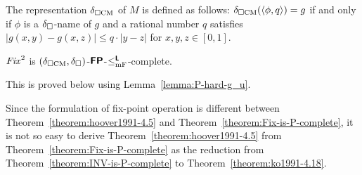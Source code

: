 \documentclass[envcountsame,orivec,oribibl]{llncs}
\begin{document}
The representation $\delta _{\square \mathrm{CM}}$ of $M$ is defined as follows:
$\delta _{\square \mathrm{CM}}(\langle \phi, q \rangle) = g$ if and only if
$\phi$ is a $\delta _\square$-name of $g$ and a rational number $q$ satisfies 
$|g(x, y) - g(x, z)| \le q \cdot |y - z|$ for  $x, y, z \in [0,1]$.

\begin{theorem}
 \label{theorem:Fix-is-P-complete}
 $\mathit{Fix}^2$ is $(\delta _{\square \mathrm{CM}}, \delta _\square)$-$\text{\bfseries \sffamily \upshape FP}$-$\leq _{\mathrm{mF}} ^{\text{\bfseries \sffamily \upshape L}}$-complete. 
\end{theorem}

This is proved below using Lemma~\ref{lemma:P-hard-g_u}. 

Since the formulation of fix-point operation is different between 
Theorem~\ref{theorem:hoover1991-4.5} and Theorem~\ref{theorem:Fix-is-P-complete},
it is not so easy to derive Theorem~\ref{theorem:hoover1991-4.5} from
Theorem~\ref{theorem:Fix-is-P-complete} as the reduction from 
Theorem~\ref{theorem:INV-is-P-complete} to Theorem~\ref{theorem:ko1991-4.18}.
\end{document}
